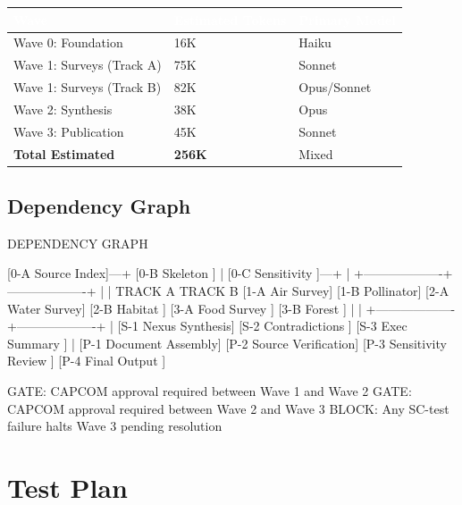 \documentclass[11pt,letterpaper]{article}
\newcommand{\tableheader}[1]{\textbf{\sffamily\textcolor{white}{#1}}}
\begin{document}
\begin{center}
\begin{tabularx}{\textwidth}{XC{2.5cm}C{2.5cm}}
\toprule
{}
\tableheader{Wave} & \tableheader{Estimated Tokens} & \tableheader{Primary Model} \\
\midrule
Wave 0: Foundation & 16K & Haiku \\
Wave 1: Surveys (Track A) & 75K & Sonnet \\
Wave 1: Surveys (Track B) & 82K & Opus/Sonnet \\
Wave 2: Synthesis & 38K & Opus \\
Wave 3: Publication & 45K & Sonnet \\
\midrule
\textbf{Total Estimated} & \textbf{256K} & Mixed \\
\bottomrule
\end{tabularx}
\end{center}

\subsection{Dependency Graph}

\begin{asciibox}
DEPENDENCY GRAPH

         [0-A Source Index]---+
         [0-B Skeleton    ]   |
         [0-C Sensitivity ]---+
                              |
          +-------------------+-------------------+
          |                                       |
    TRACK A                                 TRACK B
    [1-A Air Survey]                    [1-B Pollinator]
    [2-A Water Survey]                  [2-B Habitat   ]
    [3-A Food Survey ]                  [3-B Forest    ]
          |                                       |
          +-------------------+-------------------+
                              |
                    [S-1 Nexus Synthesis]
                    [S-2 Contradictions ]
                    [S-3 Exec Summary   ]
                              |
                    [P-1 Document Assembly]
                    [P-2 Source Verification]
                    [P-3 Sensitivity Review ]
                    [P-4 Final Output       ]

  GATE: CAPCOM approval required between Wave 1 and Wave 2
  GATE: CAPCOM approval required between Wave 2 and Wave 3
  BLOCK: Any SC-test failure halts Wave 3 pending resolution
\end{asciibox}

\section{Test Plan}
\end{document}
